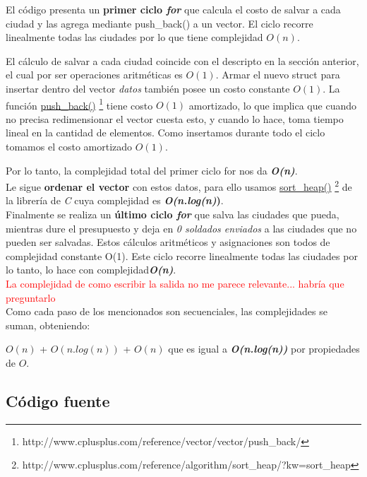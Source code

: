 \documentclass[a4paper]{article}
\begin{document}
El c\'odigo presenta un \textbf{primer ciclo \emph{for}} que calcula el costo de salvar a cada ciudad y las agrega mediante push_back() a un vector. El ciclo recorre linealmente todas las ciudades por lo que tiene complejidad $O(n)$. 

El c\'alculo de salvar a cada ciudad coincide con el descripto en la secci\'on anterior, el cual por ser operaciones aritm\'eticas es $O(1)$. Armar el nuevo struct para insertar dentro del vector \emph{datos} tambi\'en posee un costo constante $O(1)$. La funci\'on \href{http://www.cplusplus.com/reference/vector/vector/push_back/}{push\_back()} \footnote{http://www.cplusplus.com/reference/vector/vector/push_back/} tiene costo $O(1)$ amortizado, lo que implica que cuando no precisa redimensionar el vector cuesta esto, y cuando lo hace, toma tiempo lineal en la cantidad de elementos. Como insertamos durante todo el ciclo tomamos el costo amortizado $O(1)$. 

Por lo tanto, la complejidad total del primer ciclo for nos da \textbf{\textit{O(n)}}.\\

Le sigue \textbf{ordenar el vector} con estos datos, para ello usamos \href{http://www.cplusplus.com/reference/algorithm/sort_heap/?kw=sort_heap}{sort\_heap()} \footnote{http://www.cplusplus.com/reference/algorithm/sort_heap/?kw=sort_heap} de la librer\'ia de \emph{C} cuya complejidad es \textbf{\textit{O(n.log(n)})}.\\

Finalmente se realiza un \textbf{\'ultimo ciclo \emph{for}} que salva las ciudades que pueda, mientras dure el presupuesto y deja en \emph{0 soldados enviados} a las ciudades que no pueden ser salvadas. Estos c\'alculos aritm\'eticos y asignaciones son todos de complejidad constante O(1). Este ciclo recorre linealmente todas las ciudades por lo tanto, lo hace con complejidad\textbf{\textit{O(n)}}.\\

\textcolor{red}{La complejidad de como escribir la salida no me parece relevante... habr\'ia que preguntarlo}\\

Como cada paso de los mencionados son secuenciales, las complejidades se suman, obteniendo:

 $O(n)$ + $O(n.log(n))$ + $O(n)$ que es igual a \textit{\textbf{O(n.log(n))}} por propiedades de $O$.


\newpage

\subsection{C\'odigo fuente}
\end{document}
